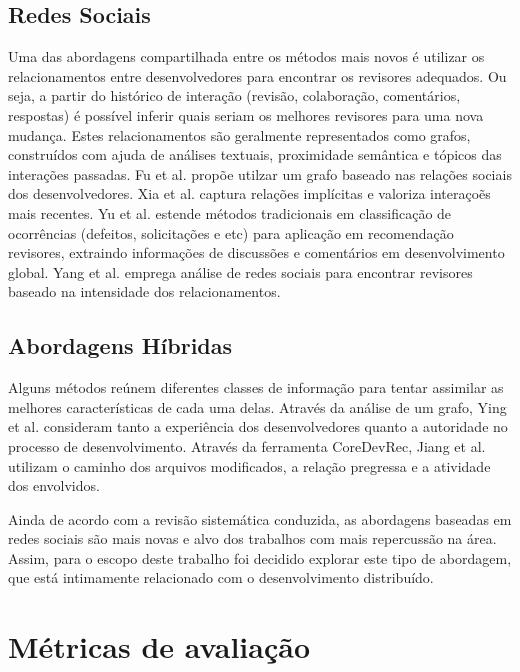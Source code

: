 \documentclass[12pt,openany,oneside,a4paper,english,brazil]{abntbibufjf}
\begin{document}
\subsection{Redes Sociais}
Uma das abordagens compartilhada entre os métodos mais novos é utilizar os relacionamentos entre desenvolvedores para encontrar os revisores adequados. Ou seja, a partir do histórico de interação (revisão, colaboração, comentários, respostas) é possível inferir quais seriam os melhores revisores para uma nova mudança. Estes relacionamentos são geralmente representados como grafos, construídos com ajuda de análises textuais, proximidade semântica e tópicos das interações passadas. Fu et al. \cite{fu2017} propõe utilzar um grafo baseado nas relações sociais dos desenvolvedores. Xia et al. \cite{xia2017} captura relações implícitas e valoriza interaçoẽs mais recentes. Yu et al. \cite{yu2014,yu2014-2} estende métodos tradicionais em classificação de ocorrências (defeitos, solicitações e etc) para aplicação em recomendação revisores, extraindo informações de discussões e comentários em desenvolvimento global. Yang et al. \cite{yang2016} emprega análise de redes sociais para encontrar revisores baseado na intensidade dos relacionamentos.


\subsection{Abordagens Híbridas}
Alguns métodos reúnem diferentes classes de informação para tentar assimilar as melhores características de cada uma delas. Através da análise de um grafo, Ying et al. \cite{ying2016} consideram tanto a experiência dos desenvolvedores quanto a autoridade no processo de desenvolvimento. Através da ferramenta CoreDevRec, Jiang et al. \cite{jiang2015} utilizam o caminho dos arquivos modificados, a relação pregressa e a atividade dos envolvidos.

Ainda de acordo com a revisão sistemática conduzida, as abordagens baseadas em redes sociais são mais novas e alvo dos trabalhos com mais repercussão na área. Assim, para o escopo deste trabalho foi decidido explorar este tipo de abordagem, que está intimamente relacionado com o desenvolvimento distribuído.



\section{Métricas de avaliação}\label{sec:metricas_revisor}
\end{document}
